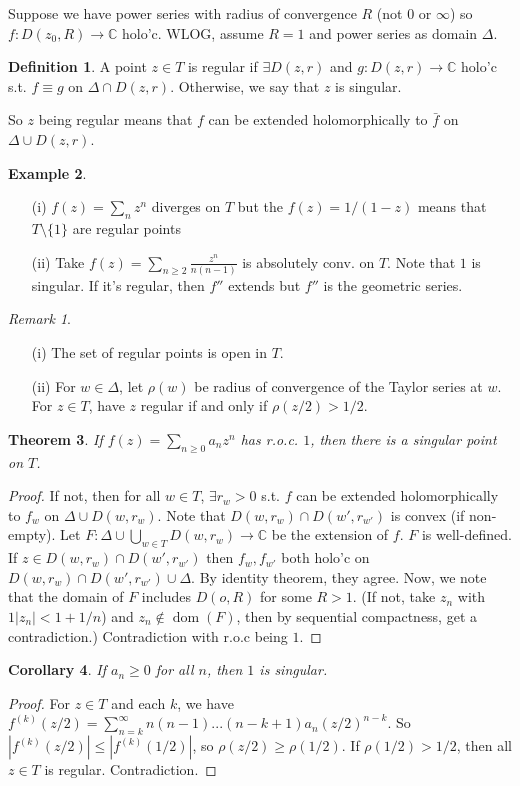 \documentclass{article}
\theoremstyle{definition}
\newtheorem{defn}{Definition}[section]
\newtheorem{example}[defn]{Example}
\theoremstyle{remark}
\newtheorem{rem}{Remark}
\theoremstyle{plain}
\newtheorem{thm}[defn]{Theorem}
\newtheorem{crly}[defn]{Corollary}
\newcommand{\CC}{\mathbb{C}}
\begin{document}
Suppose we have power series with radius of convergence $R$ (not $0$ or $\infty$) so $f:D(z_0,R)\to\CC$ holo'c. WLOG, assume $R=1$ and power series as domain $\Delta$.
\begin{defn}
    A point $z\in T$ is regular if $\exists D(z,r)$ and $g:D(z,r)\to\CC$ holo'c s.t. $f\equiv g$ on $\Delta\cap D(z,r)$. Otherwise, we say that $z$ is singular.
\end{defn}
So $z$ being regular means that $f$ can be extended holomorphically to $\bar f$ on $\Delta\cup D(z,r)$.
\begin{example}
    \begin{enumerate}
        \item[(i)] $f(z)=\sum_nz^n$ diverges on $T$ but the $f(z)=1/(1-z)$ means that $T\setminus\{1\}$ are regular points
        \item[(ii)] Take $f(z)=\sum_{n\ge 2}\frac{z^n}{n(n-1)}$ is absolutely conv. on $T$. Note that $1$ is singular. If it's regular, then $f''$ extends but $f''$ is the geometric series.
    \end{enumerate}
\end{example}
\begin{rem}
    \begin{enumerate}
        \item[(i)] The set of regular points is open in $T$.
        \item[(ii)] For $w\in\Delta$, let $\rho(w)$ be radius of convergence of the Taylor series at $w$. For $z\in T$, have $z$ regular if and only if $\rho(z/2)>1/2$.
    \end{enumerate}
\end{rem}
\begin{thm}
    If $f(z)=\sum_{n\ge 0} a_nz^n$ has r.o.c. $1$, then there is a singular point on $T$.
\end{thm}
\begin{proof}
    If not, then for all $w\in T$, $\exists r_w>0$ s.t. $f$ can be extended holomorphically to $f_w$ on $\Delta\cup D(w,r_w)$. Note that $D(w,r_w)\cap D(w',r_{w'})$ is convex (if non-empty). Let $F:\Delta\cup\bigcup_{w\in T}D(w,r_w)\to\CC$ be the extension of $f$. $F$ is well-defined. If $z\in D(w,r_w)\cap D(w',r_{w'})$ then $f_w,f_{w'}$ both holo'c on $D(w,r_w)\cap D(w',r_{w'})\cup\Delta$. By identity theorem, they agree. Now, we note that the domain of $F$ includes $D(o,R)$ for some $R>1$. (If not, take $z_n$ with $1|z_n|<1+1/n$) and $z_n\not\in\operatorname{dom}(F)$, then by sequential compactness, get a contradiction.) Contradiction with r.o.c being $1$.
\end{proof}
\begin{crly}
    If $a_n\ge0$ for all $n$, then $1$ is singular.
\end{crly}
\begin{proof}
    For $z\in T$ and each $k$, we have $f^{(k)}(z/2)=\sum_{n=k}^\infty n(n-1)...(n-k+1)a_n(z/2)^{n-k}$. So $|f^{(k)}(z/2)|\le |f^{(k)}(1/2)|$, so $\rho(z/2)\ge \rho(1/2)$. If $\rho(1/2)>1/2$, then all $z\in T$ is regular. Contradiction.
\end{proof}
\end{document}
